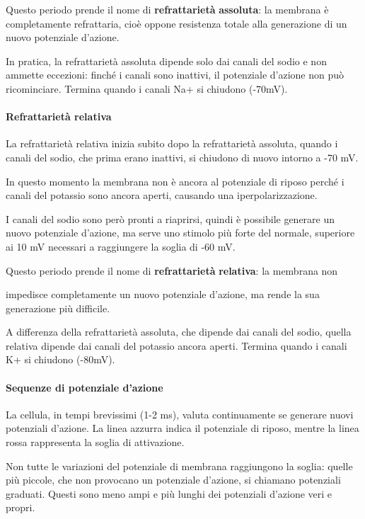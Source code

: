 \documentclass[12pt,a4paper]{book}
\begin{document}
Questo periodo prende il nome di \textbf{refrattarietà}\textbf{ }\textbf{assoluta}: la membrana è completamente refrattaria, cioè oppone resistenza totale alla generazione di un nuovo potenziale d'azione.

In pratica, la refrattarietà assoluta dipende solo dai canali del sodio e non ammette eccezioni: finché i canali sono inattivi, il potenziale d'azione non può ricominciare. Termina quando i canali Na+ si chiudono (-70mV).


\paragraph{Refrattarietà relativa}

La refrattarietà relativa inizia subito dopo la refrattarietà assoluta, quando i canali del sodio, che prima erano inattivi, si chiudono di nuovo intorno a -70 mV.

In questo momento la membrana non è ancora al potenziale di riposo perché i canali del potassio sono ancora aperti, causando una iperpolarizzazione.

I canali del sodio sono però pronti a riaprirsi, quindi è possibile generare un nuovo potenziale d'azione, ma serve uno stimolo più forte del normale, superiore ai 10 mV necessari a raggiungere la soglia di -60 mV.

Questo periodo prende il nome di \textbf{refrattarietà}\textbf{ }\textbf{relativa}: la membrana non

impedisce completamente un nuovo potenziale d'azione, ma rende la sua generazione più difficile.

A differenza della refrattarietà assoluta, che dipende dai canali del sodio, quella relativa dipende dai canali del potassio ancora aperti. Termina quando i canali K+ si chiudono (-80mV).


\paragraph{Sequenze di potenziale d'azione}

La cellula, in tempi brevissimi (1-2 ms), valuta continuamente se generare nuovi potenziali d'azione. La linea azzurra indica il potenziale di riposo, mentre la linea rossa rappresenta la soglia di attivazione.

Non tutte le variazioni del potenziale di membrana raggiungono la soglia: quelle più piccole, che non provocano un potenziale d'azione, si chiamano potenziali graduati. Questi sono meno ampi e più lunghi dei potenziali d'azione veri e propri.
\end{document}
